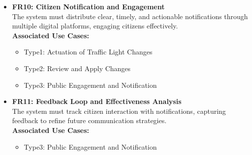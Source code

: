 \documentclass[a4paper,12pt]{article}
\begin{document}
\begin{itemize}
\item \textbf{FR10: Citizen Notification and Engagement} \\
The system must distribute clear, timely, and actionable notifications through multiple digital platforms, engaging citizens effectively. \\
\textbf{Associated Use Cases:}
\begin{itemize}
\item Type1: Actuation of Traffic Light Changes
\item Type2: Review and Apply Changes
\item Type3: Public Engagement and Notification
\end{itemize}

\item \textbf{FR11: Feedback Loop and Effectiveness Analysis} \\
The system must track citizen interaction with notifications, capturing feedback to refine future communication strategies. \\
\textbf{Associated Use Cases:}
\begin{itemize}
\item Type3: Public Engagement and Notification
\end{itemize}
\end{itemize}

\newpage
\end{document}
